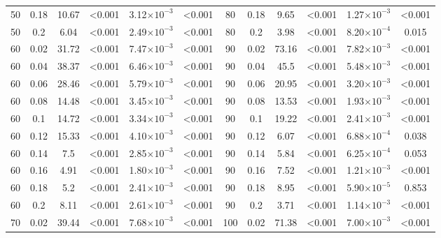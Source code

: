 \documentclass[12pt]{article}
\begin{document}
\begin{spacing}{2.0}
\begin{table}[hb!]
\begin{tabular}{c c | c c| c c ||c c | c c | c c |}
        50  & 0.18  & 10.67 & \textless0.001  & 3.12$\times10^{-3}$ & \textless0.001  & 80  & 0.18  & 9.65  & \textless0.001  & 1.27$\times10^{-3}$ & \textless0.001  \\
        50  & 0.2 & 6.04  & \textless0.001  & 2.49$\times10^{-3}$ & \textless0.001  & 80  & 0.2 & 3.98  & \textless0.001  & 8.20$\times10^{-4}$ & 0.015 \\
        60  & 0.02  & 31.72 & \textless0.001  & 7.47$\times10^{-3}$ & \textless0.001  & 90  & 0.02  & 73.16 & \textless0.001  & 7.82$\times10^{-3}$ & \textless0.001  \\
        60  & 0.04  & 38.37 & \textless0.001  & 6.46$\times10^{-3}$ & \textless0.001  & 90  & 0.04  & 45.5  & \textless0.001  & 5.48$\times10^{-3}$ & \textless0.001  \\
        60  & 0.06  & 28.46 & \textless0.001  & 5.79$\times10^{-3}$ & \textless0.001  & 90  & 0.06  & 20.95 & \textless0.001  & 3.20$\times10^{-3}$ & \textless0.001  \\
        60  & 0.08  & 14.48 & \textless0.001  & 3.45$\times10^{-3}$ & \textless0.001  & 90  & 0.08  & 13.53 & \textless0.001  & 1.93$\times10^{-3}$ & \textless0.001  \\
        60  & 0.1 & 14.72 & \textless0.001  & 3.34$\times10^{-3}$ & \textless0.001  & 90  & 0.1 & 19.22 & \textless0.001  & 2.41$\times10^{-3}$ & \textless0.001  \\
        60  & 0.12  & 15.33 & \textless0.001  & 4.10$\times10^{-3}$ & \textless0.001  & 90  & 0.12  & 6.07  & \textless0.001  & 6.88$\times10^{-4}$ & 0.038 \\
        60  & 0.14  & 7.5 & \textless0.001  & 2.85$\times10^{-3}$ & \textless0.001  & 90  & 0.14  & 5.84  & \textless0.001  & 6.25$\times10^{-4}$ & 0.053 \\
        60  & 0.16  & 4.91  & \textless0.001  & 1.80$\times10^{-3}$ & \textless0.001  & 90  & 0.16  & 7.52  & \textless0.001  & 1.21$\times10^{-3}$ & \textless0.001  \\
        60  & 0.18  & 5.2 & \textless0.001  & 2.41$\times10^{-3}$ & \textless0.001  & 90  & 0.18  & 8.95  & \textless0.001  & 5.90$\times10^{-5}$ & 0.853 \\
        60  & 0.2 & 8.11  & \textless0.001  & 2.61$\times10^{-3}$ & \textless0.001  & 90  & 0.2 & 3.71  & \textless0.001  & 1.14$\times10^{-3}$ & \textless0.001  \\
        70  & 0.02  & 39.44 & \textless0.001  & 7.68$\times10^{-3}$ & \textless0.001  & 100 & 0.02  & 71.38 & \textless0.001  & 7.00$\times10^{-3}$ & \textless0.001  \\

\end{tabular}
\end{table}
\end{spacing}
\end{document}
